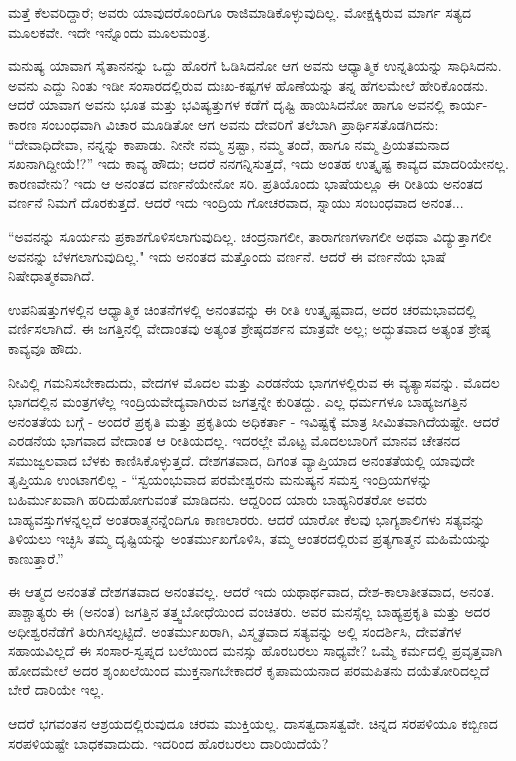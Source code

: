ಮತ್ತೆ ಕೆಲವರಿದ್ದಾರೆ; ಅವರು ಯಾವುದರೊಂದಿಗೂ ರಾಜಿಮಾಡಿಕೊಳ್ಳುವುದಿಲ್ಲ. ಮೋಕ್ಷಕ್ಕಿರುವ ಮಾರ್ಗ ಸತ್ಯದ ಮೂಲಕವೇ. ಇದೇ ಇನ್ನೊಂದು ಮೂಲಮಂತ್ರ.

ಮನುಷ್ಯ ಯಾವಾಗ ಸೈತಾನನನ್ನು ಒದ್ದು ಹೊರಗೆ ಓಡಿಸಿದನೋ ಆಗ ಅವನು ಆಧ್ಯಾತ್ಮಿಕ ಉನ್ನತಿಯನ್ನು ಸಾಧಿಸಿದನು. ಅವನು ಎದ್ದು ನಿಂತು ಇಡೀ ಸಂಸಾರದಲ್ಲಿರುವ ದುಃಖ-ಕಷ್ಟಗಳ ಹೊಣೆಯನ್ನು ತನ್ನ ಹೆಗಲಮೇಲೆ ಹೇರಿಕೊಂಡನು. ಆದರೆ ಯಾವಾಗ ಅವನು ಭೂತ ಮತ್ತು ಭವಿಷ್ಯತ್ತುಗಳ ಕಡೆಗೆ ದೃಷ್ಟಿ ಹಾಯಿಸಿದನೋ ಹಾಗೂ ಅವನಲ್ಲಿ ಕಾರ್ಯ-ಕಾರಣ ಸಂಬಂಧವಾಗಿ ವಿಚಾರ ಮೂಡಿತೋ ಆಗ ಅವನು ದೇವರಿಗೆ ತಲೆಬಾಗಿ ಪ್ರಾರ್ಥಿಸತೊಡಗಿದನು: “ದೇವಾಧಿದೇವಾ, ನನ್ನನ್ನು ಕಾಪಾಡು. ನೀನೇ ನಮ್ಮ ಸ್ರಷ್ಟಾ, ನಮ್ಮ ತಂದೆ, ಹಾಗೂ ನಮ್ಮ ಪ್ರಿಯತಮನಾದ ಸಖನಾಗಿದ್ದೀಯೆ!?” ಇದು ಕಾವ್ಯ ಹೌದು; ಆದರೆ ನನಗನ್ನಿಸುತ್ತದೆ, ಇದು ಅಂತಹ ಉತ್ಕೃಷ್ಟ ಕಾವ್ಯದ ಮಾದರಿಯೇನಲ್ಲ. ಕಾರಣವೇನು? ಇದು ಆ ಅನಂತದ ವರ್ಣನೆಯೇನೋ ಸರಿ. ಪ್ರತಿಯೊಂದು ಭಾಷೆಯಲ್ಲೂ ಈ ರೀತಿಯ ಅನಂತದ ವರ್ಣನೆ ನಿಮಗೆ ದೊರಕುತ್ತದೆ. ಆದರೆ ಇದು ಇಂದ್ರಿಯ ಗೋಚರವಾದ, ಸ್ನಾಯು ಸಂಬಂಧವಾದ ಅನಂತ...

“ಅವನನ್ನು ಸೂರ್ಯನು ಪ್ರಕಾಶಗೊಳಿಸಲಾಗುವುದಿಲ್ಲ. ಚಂದ್ರನಾಗಲೀ, ತಾರಾಗಣಗಳಾಗಲೀ ಅಥವಾ ವಿದ್ಯುತ್ತಾಗಲೀ ಅವನನ್ನು ಬೆಳಗಲಾಗುವುದಿಲ್ಲ." ಇದು ಅನಂತದ ಮತ್ತೊಂದು ವರ್ಣನೆ. ಆದರೆ ಈ ವರ್ಣನೆಯ ಭಾಷೆ ನಿಷೇಧಾತ್ಮಕವಾಗಿದೆ.

ಉಪನಿಷತ್ತುಗಳಲ್ಲಿನ ಆಧ್ಯಾತ್ಮಿಕ ಚಿಂತನೆಗಳಲ್ಲಿ ಅನಂತವನ್ನು ಈ ರೀತಿ ಉತ್ಕೃಷ್ಟವಾದ, ಅದರ ಚರಮಭಾವದಲ್ಲಿ ವರ್ಣಿಸಲಾಗಿದೆ. ಈ ಜಗತ್ತಿನಲ್ಲಿ ವೇದಾಂತವು ಅತ್ಯಂತ ಶ್ರೇಷ್ಠದರ್ಶನ ಮಾತ್ರವೇ ಅಲ್ಲ; ಅದ್ಭುತವಾದ ಅತ್ಯಂತ ಶ್ರೇಷ್ಠ ಕಾವ್ಯವೂ ಹೌದು.

ನೀವಿಲ್ಲಿ ಗಮನಿಸಬೇಕಾದುದು, ವೇದಗಳ ಮೊದಲ ಮತ್ತು ಎರಡನೆಯ ಭಾಗಗಳಲ್ಲಿರುವ ಈ ವ್ಯತ್ಯಾಸವನ್ನು. ಮೊದಲ ಭಾಗದಲ್ಲಿನ ಮಂತ್ರಗಳೆಲ್ಲ ಇಂದ್ರಿಯವೇದ್ಯವಾಗಿರುವ ಜಗತ್ತನ್ನೇ ಕುರಿತದ್ದು. ಎಲ್ಲ ಧರ್ಮಗಳೂ ಬಾಹ್ಯಜಗತ್ತಿನ ಅನಂತತೆಯ ಬಗ್ಗೆ - ಅಂದರೆ ಪ್ರಕೃತಿ ಮತ್ತು ಪ್ರಕೃತಿಯ ಅಧಿಕರ್ತಾ - ಇವಿಷ್ಟಕ್ಕೆ ಮಾತ್ರ ಸೀಮಿತವಾಗಿದೆಯಷ್ಟೇ. ಆದರೆ ಎರಡನೆಯ ಭಾಗವಾದ ವೇದಾಂತ ಆ ರೀತಿಯದಲ್ಲ. ಇದರಲ್ಲೇ ಮೊಟ್ಟ ಮೊದಲಬಾರಿಗೆ ಮಾನವ ಚೇತನದ ಸಮುಜ್ವಲವಾದ ಬೆಳಕು ಕಾಣಿಸಿಕೊಳ್ಳುತ್ತದೆ. ದೇಶಗತವಾದ, ದಿಗಂತ ವ್ಯಾಪ್ತಿಯಾದ ಅನಂತತೆಯಲ್ಲಿ ಯಾವುದೇ ತೃಪ್ತಿಯೂ ಉಂಟಾಗಲಿಲ್ಲ - “ಸ್ವಯಂಭುವಾದ ಪರಮೇಶ್ವರನು ಮನುಷ್ಯನ ಸಮಸ್ತ ಇಂದ್ರಿಯಗಳನ್ನು ಬಹಿರ್ಮುಖವಾಗಿ ಹರಿದುಹೋಗುವಂತೆ ಮಾಡಿದನು. ಆದ್ದರಿಂದ ಯಾರು ಬಾಹ್ಯನಿರತರೋ ಅವರು ಬಾಹ್ಯವಸ್ತುಗಳನ್ನಲ್ಲದೆ ಅಂತರಾತ್ಮನನ್ನೆಂದಿಗೂ ಕಾಣಲಾರರು. ಆದರೆ ಯಾರೋ ಕೆಲವು ಭಾಗ್ಯಶಾಲಿಗಳು ಸತ್ಯವನ್ನು ತಿಳಿಯಲು ಇಚ್ಛಿಸಿ ತಮ್ಮ ದೃಷ್ಟಿಯನ್ನು ಅಂತರ್ಮುಖಗೊಳಿಸಿ, ತಮ್ಮ ಆಂತರದಲ್ಲಿರುವ ಪ್ರತ್ಯಗಾತ್ಮನ ಮಹಿಮೆಯನ್ನು ಕಾಣುತ್ತಾರೆ.”

ಈ ಆತ್ಮದ ಅನಂತತೆ ದೇಶಗತವಾದ ಅನಂತವಲ್ಲ. ಆದರೆ ಇದು ಯಥಾರ್ಥವಾದ, ದೇಶ-ಕಾಲಾತೀತವಾದ, ಅನಂತ. ಪಾಶ್ಚಾತ್ಯರು ಈ (ಅನಂತ) ಜಗತ್ತಿನ ತತ್ತ್ವಬೋಧೆಯಿಂದ ವಂಚಿತರು. ಅವರ ಮನಸ್ಸೆಲ್ಲ ಬಾಹ್ಯಪ್ರಕೃತಿ ಮತ್ತು ಅದರ ಅಧೀಶ್ವರನೆಡೆಗೆ ತಿರುಗಿಸಲ್ಪಟ್ಟಿದೆ. ಅಂತರ್ಮುಖರಾಗಿ, ವಿಸ್ಮೃತವಾದ ಸತ್ಯವನ್ನು ಅಲ್ಲಿ ಸಂದರ್ಶಿಸಿ, ದೇವತೆಗಳ ಸಹಾಯವಿಲ್ಲದೆ ಈ ಸಂಸಾರ-ಸ್ವಪ್ನದ ಬಲೆಯಿಂದ ಮನಸ್ಸು ಹೊರಬರಲು ಸಾಧ್ಯವೇ? ಒಮ್ಮೆ ಕರ್ಮದಲ್ಲಿ ಪ್ರವೃತ್ತವಾಗಿ ಹೋದಮೇಲೆ ಅದರ ಶೃಂಖಲೆಯಿಂದ ಮುಕ್ತನಾಗಬೇಕಾದರೆ ಕೃಪಾಮಯನಾದ ಪರಮಪಿತನು ದಯೆತೋರಿದಲ್ಲದೆ ಬೇರೆ ದಾರಿಯೇ ಇಲ್ಲ.

ಆದರೆ ಭಗವಂತನ ಆಶ್ರಯದಲ್ಲಿರುವುದೂ ಚರಮ ಮುಕ್ತಿಯಲ್ಲ. ದಾಸತ್ವ\break ದಾಸತ್ವವೇ. ಚಿನ್ನದ ಸರಪಳಿಯೂ ಕಬ್ಬಿಣದ ಸರಪಳಿಯಷ್ಟೇ ಬಾಧಕವಾದುದು. ಇದರಿಂದ ಹೊರಬರಲು ದಾರಿಯಿದೆಯೆ?

